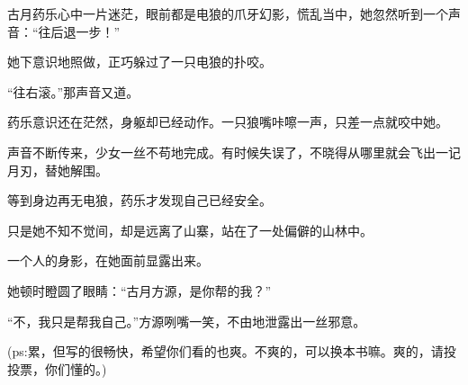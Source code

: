 \begin{this_body}
古月药乐心中一片迷茫，眼前都是电狼的爪牙幻影，慌乱当中，她忽然听到一个声音：“往后退一步！”

她下意识地照做，正巧躲过了一只电狼的扑咬。

“往右滚。”那声音又道。

药乐意识还在茫然，身躯却已经动作。一只狼嘴咔嚓一声，只差一点就咬中她。

声音不断传来，少女一丝不苟地完成。有时候失误了，不晓得从哪里就会飞出一记月刃，替她解围。

等到身边再无电狼，药乐才发现自己已经安全。

只是她不知不觉间，却是远离了山寨，站在了一处偏僻的山林中。

一个人的身影，在她面前显露出来。

她顿时瞪圆了眼睛：“古月方源，是你帮的我？”

“不，我只是帮我自己。”方源咧嘴一笑，不由地泄露出一丝邪意。

(ps:累，但写的很畅快，希望你们看的也爽。不爽的，可以换本书嘛。爽的，请投投票，你们懂的。)

\end{this_body}

